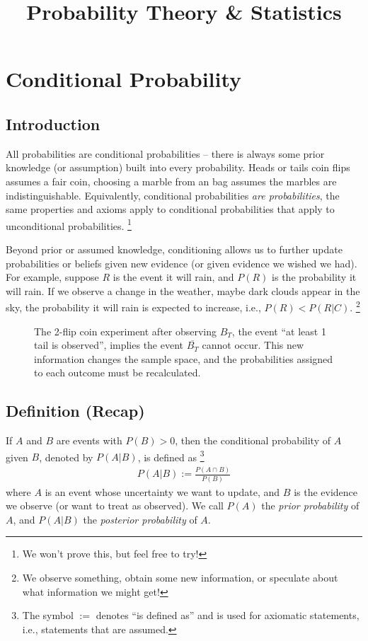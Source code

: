\documentclass[11pt,a4paper]{article}
\title{Probability Theory \& Statistics}
\begin{document}
\maketitle
\newpage

\section{Conditional Probability}

\subsection{Introduction}

All probabilities are conditional probabilities 
-- there is always some prior knowledge (or assumption) built 
into every probability. 
Heads or tails coin flips assumes a fair coin, 
choosing a marble from an bag assumes the marbles are indistinguishable.
Equivalently, 
conditional probabilities \emph{are probabilities}, 
the same properties and axioms apply to conditional probabilities that apply
to unconditional probabilities.%
\footnote{We won't prove this, but feel free to try!}

Beyond prior or assumed knowledge, 
conditioning allows us to further update probabilities 
or beliefs given new evidence (or given evidence we wished we had). 
For example, 
suppose \(R\) is the event it will rain, 
and \(P(R)\) is the probability it will rain. 
If we observe a change in the weather, 
maybe dark clouds appear in the sky, 
the probability it will rain is expected to increase,
i.e., \(P(R) < P(R|C)\).%
\footnote{We observe something, 
obtain some new information, 
or speculate about what information we might get!}

\begin{figure}[h!]
\centering

\caption{%
The 2-flip coin experiment after observing \(B_{T}\), 
the event ``at least 1 tail is observed'', 
implies the event \(\overline{B_{T}}\) cannot occur.
This new information changes the sample space, 
and the probabilities assigned to each outcome must be recalculated.%
}
\label{fig:conditioning}
\end{figure}

\subsection{Definition (Recap)}

If \(A\) and \(B\) are events with \(P(B) > 0\), 
then the conditional probability of \(A\) given \(B\), 
denoted by \(P(A|B)\), 
is defined as%
\footnote{The symbol \(:=\) denotes ``is defined as'' and is used for axiomatic statements, i.e., statements that are assumed.}
\begin{align}
P\left( A | B \right) := \frac{P(A \cap B)}{P(B)}
\end{align}
where \(A\) is an event whose uncertainty we want to update, and \(B\)
is the evidence we observe (or want to treat as observed). We call
\(P(A)\) the \emph{prior probability} of \(A\), and \(P(A|B)\) the
\emph{posterior probability} of \(A\).
\end{document}
